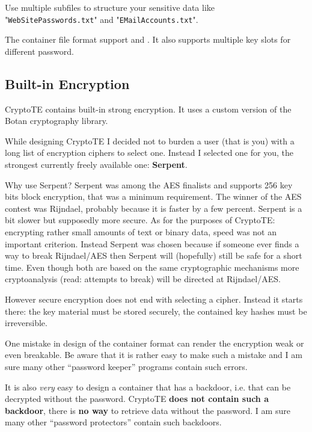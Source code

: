 \documentclass[a4paper,12pt,twoside]{article}
\begin{document}
Use multiple subfiles to structure your sensitive data like "\texttt{Web\-Site\-Passwords.txt}" and "\texttt{EMail\-Accounts.txt}".

The container file format support  and . It also supports multiple key slots for different password.

\subsection{Built-in Encryption}\label{Encryption}

CryptoTE contains built-in strong encryption. It uses a custom version of the Botan cryptography library.

While designing CryptoTE I decided not to burden a user (that is you) with a long list of encryption ciphers to select one. Instead I selected one for you, the strongest currently freely available one: \textbf{Serpent}.

Why use Serpent? Serpent was among the AES finalists and supports 256 key bits block encryption, that was a minimum requirement. The winner of the AES contest was Rijndael, probably because it is faster by a few percent. Serpent is a bit slower but supposedly more secure. As for the purposes of CryptoTE: encrypting rather small amounts of text or binary data, speed was not an important criterion. Instead Serpent was chosen because if someone ever finds a way to break Rijndael/AES then Serpent will (hopefully) still be safe for a short time. Even though both are based on the same cryptographic mechanisms more cryptoanalysis (read: attempts to break) will be directed at Rijndael/AES.

However secure encryption does not end with selecting a cipher. Instead it starts there: the key material must be stored securely, the contained key hashes must be irreversible.

One mistake in design of the container format can render the encryption weak or even breakable. Be aware that it is rather easy to make such a mistake and I am sure many other ``password keeper'' programs contain such errors.

It is also \emph{very} easy to design a container that has a backdoor, i.e. that can be decrypted without the password. CryptoTE \textbf{does not contain such a backdoor}, there is \textbf{no way} to retrieve data without the password. I am sure many other ``password protectors'' contain such backdoors.
\end{document}
